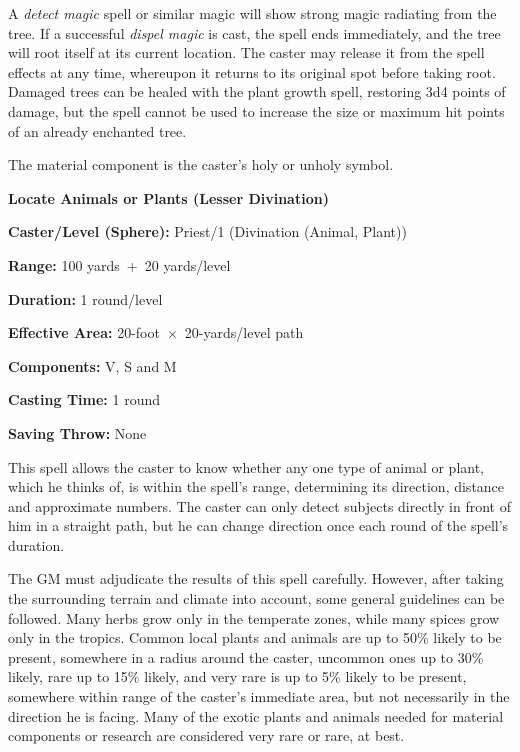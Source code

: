 \begin{multicols}{2}
A \textit{detect magic} spell or similar magic will show strong magic radiating from the tree.  If a successful \textit{dispel magic} is cast, the spell ends immediately, and the tree will root itself at its current location.  The caster may release it from the spell effects at any time, whereupon it returns to its original spot before taking root.  Damaged trees can be healed with the plant growth spell, restoring 3d4 points of damage, but the spell cannot be used to increase the size or maximum hit points of an already enchanted tree.
 
The material component is the caster's holy or unholy symbol.

\vspace{1em}

\noindent
\begin{minipage}{\columnwidth}

\noindent \textbf{Locate Animals or Plants (Lesser Divination)}

\noindent \textbf{Caster/Level (Sphere):} Priest/1 (Divination (Animal, Plant))

\noindent \textbf{Range:} 100 yards~+~20 yards/level

\noindent \textbf{Duration:} 1 round/level

\noindent \textbf{Effective Area:} 20-foot~$\times$~20-yards/level path

\noindent \textbf{Components:} V, S and M

\noindent \textbf{Casting Time:} 1 round

\noindent \textbf{Saving Throw:} None

\end{minipage}

This spell allows the caster to know whether any one type of animal or plant, which he thinks of, is within the spell's range, determining its direction, distance and approximate numbers.  The caster can only detect subjects directly in front of him in a straight path, but he can change direction once each round of the spell's duration.

The GM must adjudicate the results of this spell carefully.  However, after taking the surrounding terrain and climate into account, some general guidelines can be followed.  Many herbs grow only in the temperate zones, while many spices grow only in the tropics.  Common local plants and animals are up to 50\% likely to be present, somewhere in a radius around the caster, uncommon ones up to 30\% likely, rare up to 15\% likely, and very rare is up to 5\% likely to be present, somewhere within range of the caster's immediate area, but not necessarily in the direction he is facing.  Many of the exotic plants and animals needed for material components or research are considered very rare or rare, at best.


\end{multicols}

